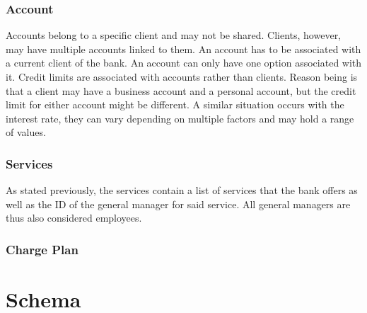 \documentclass[letterpaper, 12pt]{article}
\begin{document}
\subsubsection{Account}
Accounts belong to a specific client and may not be shared.
Clients, however, may have multiple accounts linked to them.
An account has to be associated with a current client of the bank.
An account can only have one option associated with it.%
Credit limits are associated with accounts rather than clients.
Reason being is that a client may have a business account and a personal account, but the credit limit for either account might be different.
A similar situation occurs with the interest rate, they can vary depending on multiple factors and may hold a range of values.


\subsubsection{Services}
As stated previously, the services contain a list of services that the bank offers as well as the ID of the general manager for said service.
All general managers are thus also considered employees.

\subsubsection{Charge Plan}

\section{Schema}

\begin{figure}[ht]
  
\end{figure}
\end{document}
